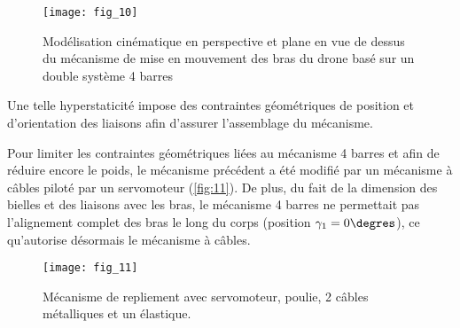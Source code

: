 \begin{figure}[H]
\centering
\texttt{[image: fig\_10]}
\caption{\label{fig:10} Modélisation cinématique en perspective et plane en vue de dessus du mécanisme de mise en mouvement des bras du drone basé sur un double système 4 barres}
\end{figure}


Une telle hyperstaticité impose des contraintes géométriques de position et d’orientation des
liaisons afin d’assurer l’assemblage du mécanisme.



Pour limiter les contraintes géométriques liées au mécanisme 4 barres et afin de réduire
encore le poids, le mécanisme précédent a été modifié par un mécanisme à câbles piloté
par un servomoteur (\autoref{fig:11}). De plus, du fait de la dimension des bielles et des liaisons
avec les bras, le mécanisme 4 barres ne permettait pas l’alignement complet des bras le
long du corps (position $\gamma_1 = 0\degres$), ce qu’autorise désormais le mécanisme à câbles.

\begin{figure}[H]
\centering
\texttt{[image: fig\_11]}
\caption{\label{fig:11} Mécanisme de repliement avec servomoteur, poulie, 2 câbles métalliques et un
élastique.}
\end{figure}

